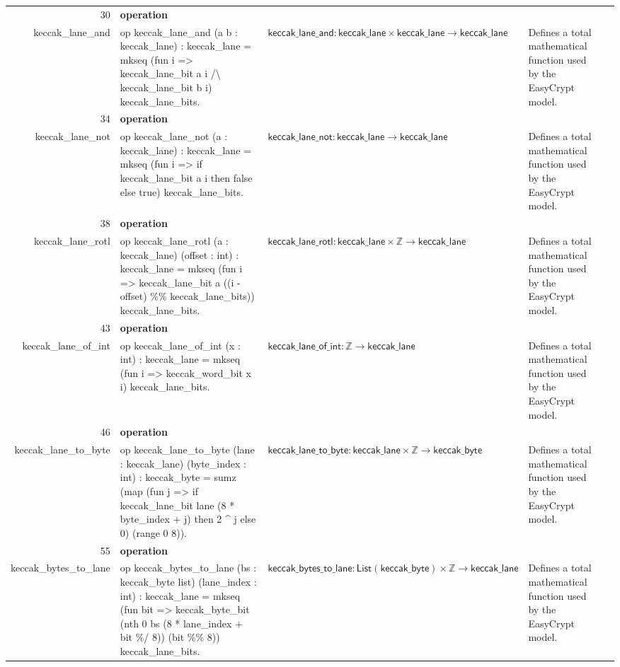 \documentclass[10pt]{article}
\newcommand{\ec}[1]{\begingroup\ttfamily\scriptsize #1\endgroup}
\begin{document}
\begin{longtable}{r L{0.17\textwidth} L{0.26\textwidth} L{0.27\textwidth} L{0.20\textwidth}}
30 & \textbf{operation}\\\ec{keccak\_lane\_and} & \ec{op keccak\_lane\_and (a b : keccak\_lane) : keccak\_lane = mkseq (fun i => keccak\_lane\_bit a i /\textbackslash{} keccak\_lane\_bit b i) keccak\_lane\_bits.} & \(\mathsf{keccak\_lane\_and} : \mathsf{keccak\_lane} \times \mathsf{keccak\_lane} \to \mathsf{keccak\_lane}\) & Defines a total mathematical function used by the EasyCrypt model. \\
34 & \textbf{operation}\\\ec{keccak\_lane\_not} & \ec{op keccak\_lane\_not (a : keccak\_lane) : keccak\_lane = mkseq (fun i => if keccak\_lane\_bit a i then false else true) keccak\_lane\_bits.} & \(\mathsf{keccak\_lane\_not} : \mathsf{keccak\_lane} \to \mathsf{keccak\_lane}\) & Defines a total mathematical function used by the EasyCrypt model. \\
38 & \textbf{operation}\\\ec{keccak\_lane\_rotl} & \ec{op keccak\_lane\_rotl (a : keccak\_lane) (offset : int) : keccak\_lane = mkseq (fun i => keccak\_lane\_bit a ((i - offset) \%\% keccak\_lane\_bits)) keccak\_lane\_bits.} & \(\mathsf{keccak\_lane\_rotl} : \mathsf{keccak\_lane} \times \mathbb{Z} \to \mathsf{keccak\_lane}\) & Defines a total mathematical function used by the EasyCrypt model. \\
43 & \textbf{operation}\\\ec{keccak\_lane\_of\_int} & \ec{op keccak\_lane\_of\_int (x : int) : keccak\_lane = mkseq (fun i => keccak\_word\_bit x i) keccak\_lane\_bits.} & \(\mathsf{keccak\_lane\_of\_int} : \mathbb{Z} \to \mathsf{keccak\_lane}\) & Defines a total mathematical function used by the EasyCrypt model. \\
46 & \textbf{operation}\\\ec{keccak\_lane\_to\_byte} & \ec{op keccak\_lane\_to\_byte (lane : keccak\_lane) (byte\_index : int) : keccak\_byte = sumz (map (fun j => if keccak\_lane\_bit lane (8 * byte\_index + j) then 2 \textasciicircum{} j else 0) (range 0 8)).} & \(\mathsf{keccak\_lane\_to\_byte} : \mathsf{keccak\_lane} \times \mathbb{Z} \to \mathsf{keccak\_byte}\) & Defines a total mathematical function used by the EasyCrypt model. \\
55 & \textbf{operation}\\\ec{keccak\_bytes\_to\_lane} & \ec{op keccak\_bytes\_to\_lane (bs : keccak\_byte list) (lane\_index : int) : keccak\_lane = mkseq (fun bit => keccak\_byte\_bit (nth 0 bs (8 * lane\_index + bit \%/ 8)) (bit \%\% 8)) keccak\_lane\_bits.} & \(\mathsf{keccak\_bytes\_to\_lane} : \mathsf{List}(\mathsf{keccak\_byte}) \times \mathbb{Z} \to \mathsf{keccak\_lane}\) & Defines a total mathematical function used by the EasyCrypt model. \\

\end{longtable}
\end{document}
